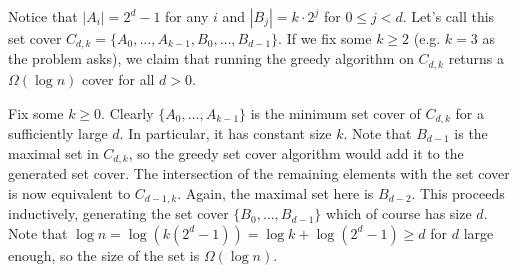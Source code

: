 \documentclass[11pt,letterpaper]{article}
\begin{document}
\begin{solution}
\begin{figure}[h]
    \end{figure}
    Notice that $|A_i|=2^d-1$ for any $i$ and $|B_j|=k\cdot 2^j$ for $0\leq j<d$. Let's call this set cover $C_{d,k}=\{A_0, \ldots, A_{k-1}, B_0, \ldots, B_{d-1}\}$. If we fix some $k\geq 2$ (e.g. $k=3$ as the problem asks), we claim that running the greedy algorithm on $C_{d,k}$ returns a $\Omega(\log n)$ cover for all $d>0$.
    
    Fix some $k\geq 0$. Clearly $\{A_0,\ldots,A_{k-1}\}$ is the minimum set cover of $C_{d,k}$ for a sufficiently large $d$. In particular, it has constant size $k$. Note that $B_{d-1}$ is the maximal set in $C_{d,k}$, so the greedy set cover algorithm would add it to the generated set cover. The intersection of the remaining elements with the set cover is now equivalent to $C_{d-1,k}$. Again, the maximal set here is $B_{d-2}$. This proceeds inductively, generating the set cover $\{B_0,\ldots,B_{d-1}\}$ which of course has size $d$. Note that $\log n=\log (k(2^d-1))=\log k+\log(2^d-1) \geq d$ for $d$ large enough, so the size of the set is $\Omega(\log n)$.  
\end{solution}
\end{document}
